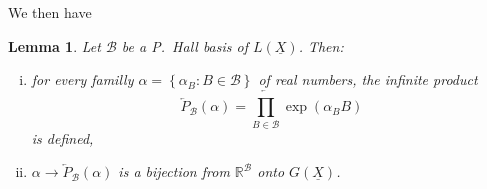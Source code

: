 \documentclass[leqno]{article}
\theoremstyle{plain}
\newtheorem*{lemma*}{Lemma}
\begin{document}
We then have

\begin{lemma*}
	Let $\mathcal{B}$ be a P.\ Hall basis of $L(\underline{X})$. Then:
	\begin{enumerate}[(i)]
		\item for every familly $\alpha=\left\{\alpha_{B}: B \in \mathcal{B}\right\}$ of real numbers, the infinite product
		\begin{equation}
			\overleftarrow{P}_{\mathcal{B}}(\alpha) = \overleftarrow{\prod_{B\in\mathcal{B}}} \exp (\alpha_B B)
		\end{equation}
		is defined,
		\item $\alpha \rightarrow \overleftarrow{P}_{\mathcal{B}}(\alpha)$ is a bijection from $\mathbb{R}^{\mathcal{B}}$ onto $G(\underline{X})$.
	\end{enumerate}
\end{lemma*}
\end{document}

